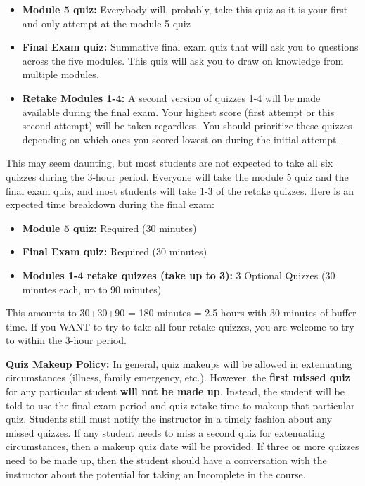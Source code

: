 \documentclass[12pt]{article}
\begin{document}
\begin{itemize}
\item  \textbf{Module 5 quiz:} Everybody will, probably, take this quiz as it is your first and only attempt at the module 5 quiz
\item \textbf{Final Exam quiz:} Summative final exam quiz that will ask you to questions across the five modules. This quiz will ask you to draw on knowledge from multiple modules.
\item \textbf{Retake Modules 1-4:} A second version of quizzes 1-4 will be made available during the final exam. Your highest score (first attempt or this second attempt) will be taken regardless. You should prioritize these quizzes depending on which ones you scored lowest on during the initial attempt.
\end{itemize}

This may seem daunting, but most students are not expected to take all six quizzes during the 3-hour period. Everyone will take the module 5 quiz and the final exam quiz, and most students will take 1-3 of the retake quizzes. Here is an expected time breakdown during the final exam:

\begin{itemize}
\item  \textbf{Module 5 quiz:} Required (30 minutes)
\item  \textbf{Final Exam quiz:} Required (30 minutes)
\item  \textbf{Modules 1-4 retake quizzes (take up to 3):} 3 Optional Quizzes (30 minutes each, up to 90 minutes)
\end{itemize}

This amounts to 30+30+90 = 180 minutes = 2.5 hours with 30 minutes of buffer time. If you WANT to try to take all four retake quizzes, you are welcome to try to within the 3-hour period. 


\textbf{Quiz Makeup Policy:} In general, quiz makeups will be allowed in extenuating circumstances (illness, family emergency, etc.). However, the \textbf{first missed quiz} for any particular student \textbf{will not be made up}. Instead, the student will be told to use the final exam period and quiz retake time to makeup that particular quiz. Students still must notify the instructor in a timely fashion about any missed quizzes. If any student needs to miss a second quiz for extenuating circumstances, then a makeup quiz date will be provided. If three or more quizzes need to be made up, then the student should have a conversation with the instructor about the potential for taking an Incomplete in the course. 
\end{document}
